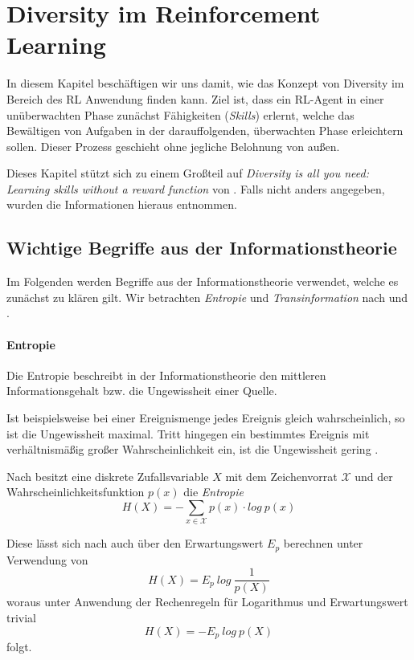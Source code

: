 \section{Diversity im Reinforcement Learning}
\label{sec:diversity}
In diesem Kapitel beschäftigen wir uns damit, wie das Konzept von Diversity im Bereich des RL Anwendung finden kann. Ziel ist, dass ein RL-Agent in einer unüberwachten Phase zunächst Fähigkeiten (\textit{Skills}) erlernt, welche das Bewältigen von Aufgaben in der darauffolgenden, überwachten Phase erleichtern sollen. Dieser Prozess geschieht ohne jegliche Belohnung von außen. 

Dieses Kapitel stützt sich zu einem Großteil auf \textit{Diversity is all you need: Learning skills without a reward function} von \citeauthor{diversity_eysenbach} \cite{diversity_eysenbach}. Falls nicht anders angegeben, wurden die Informationen hieraus entnommen.

\subsection{Wichtige Begriffe aus der Informationstheorie}
\label{sec:informationtheory}
Im Folgenden werden Begriffe aus der Informationstheorie verwendet, welche es zunächst zu klären gilt. Wir betrachten \textit{Entropie} und \textit{Transinformation} nach \cite{elements_cover} und \cite{information_werner}.

\paragraph{Entropie}

Die Entropie beschreibt in der Informationstheorie den mittleren Informationsgehalt bzw. die Ungewissheit einer Quelle.

Ist beispielsweise bei einer Ereignismenge jedes Ereignis gleich wahrscheinlich, so ist die Ungewissheit maximal. Tritt hingegen ein bestimmtes Ereignis mit verhältnismäßig großer Wahrscheinlichkeit ein, ist die Ungewissheit gering \cite{information_werner}.

Nach \cite{elements_cover} besitzt eine diskrete Zufallsvariable $ X $ mit dem Zeichenvorrat $ \mathcal{X} $ und der Wahrscheinlichkeitsfunktion $ p(x) $ die \textit{Entropie}
\begin{equation*}
    H(X) = -\sum_{x \in \mathcal{X}} p(x) \cdot log\ p(x) \label{eq:entropy}
\end{equation*}

Diese lässt sich nach \cite{elements_cover} auch über den Erwartungswert $ E_p $ berechnen unter Verwendung von
\begin{equation*}
    H(X) = E_p\ log\ \frac{1}{p(X)} \label{eq:entropy_1}
\end{equation*}
woraus unter Anwendung der Rechenregeln für Logarithmus und Erwartungswert trivial
\begin{equation}
    H(X) = - E_p\ log\ p(X) \label{eq:entropy_2}
\end{equation}
folgt.

